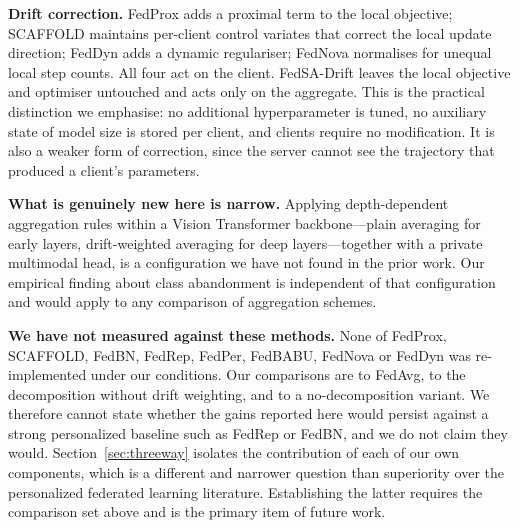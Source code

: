 \documentclass{ieeeaccess}
\newcommand{\sadrift}{FedSA-Drift}
\begin{document}
\textbf{Drift correction.} FedProx adds a proximal term to the local objective; SCAFFOLD maintains per-client control variates that correct the local update direction; FedDyn adds a dynamic regulariser; FedNova normalises for unequal local step counts. All four act on the client. \sadrift{} leaves the local objective and optimiser untouched and acts only on the aggregate. This is the practical distinction we emphasise: no additional hyperparameter is tuned, no auxiliary state of model size is stored per client, and clients require no modification. It is also a weaker form of correction, since the server cannot see the trajectory that produced a client's parameters.

\textbf{What is genuinely new here is narrow.} Applying depth-dependent aggregation rules within a Vision Transformer backbone---plain averaging for early layers, drift-weighted averaging for deep layers---together with a private multimodal head, is a configuration we have not found in the prior work. Our empirical finding about class abandonment is independent of that configuration and would apply to any comparison of aggregation schemes.

\textbf{We have not measured against these methods.} None of FedProx, SCAFFOLD, FedBN, FedRep, FedPer, FedBABU, FedNova or FedDyn was re-implemented under our conditions. Our comparisons are to FedAvg, to the decomposition without drift weighting, and to a no-decomposition variant. We therefore cannot state whether the gains reported here would persist against a strong personalized baseline such as FedRep or FedBN, and we do not claim they would. Section~\ref{sec:threeway} isolates the contribution of each of our own components, which is a different and narrower question than superiority over the personalized federated learning literature. Establishing the latter requires the comparison set above and is the primary item of future work.
\end{document}
